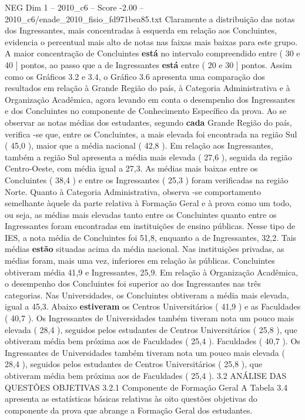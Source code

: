 \begin{textsample}{NEG Dim 1 – 2010\_c6 – Score -2.00 – 2010\_c6/enade\_2010\_fisio\_fd971bea85.txt}
Claramente a distribuição das notas dos Ingressantes, mais concentradas à esquerda em relação aos Concluintes, evidencia o percentual mais alto de notas nas faixas mais baixas para este grupo.
A maior concentração de Concluintes \textbf{está} no intervalo compreendido entre ( 30 e 40 ] pontos, ao passo que a de Ingressantes \textbf{está} entre ( 20 e 30 ] pontos.
Assim como os Gráficos 3.2 e 3.4, o Gráfico 3.6 apresenta uma comparação dos resultados em relação à Grande Região do país, à Categoria Administrativa e à Organização Acadêmica, agora levando em conta o desempenho dos Ingressantes e dos Concluintes no componente de Conhecimento Específico da prova.
Ao se observar as notas médias dos estudantes, segundo \textbf{cada} Grande Região do país, verifica -se que, entre os Concluintes, a mais elevada foi encontrada na região Sul ( 45,0 ), maior que a média nacional ( 42,8 ).
Em relação aos Ingressantes, também a região Sul apresenta a média mais elevada ( 27,6 ), seguida da região Centro-Oeste, com média igual a 27,3.
As médias mais baixas entre os Concluintes ( 38,4 ) e entre os Ingressantes ( 25,3 ) foram verificadas na região Norte.
Quanto à Categoria Administrativa, observa -se comportamento semelhante àquele da parte relativa à Formação Geral e à prova como um todo, ou seja, as médias mais elevadas tanto entre os Concluintes quanto entre os Ingressantes foram encontradas em instituições de ensino públicas.
Nesse tipo de IES, a nota média de Concluintes foi 51,8, enquanto a de Ingressantes, 32,2.
Tais médias \textbf{estão} situadas acima da média nacional.
Nas instituições privadas, as médias foram, mais uma vez, inferiores em relação às públicas.
Concluintes obtiveram média 41,9 e Ingressantes, 25,9.
Em relação à Organização Acadêmica, o desempenho dos Concluintes foi superior ao dos Ingressantes nas três categorias.
Nas Universidades, os Concluintes obtiveram a média mais elevada, igual a 45,3.
Abaixo \textbf{estiveram} os Centros Universitários ( 41,9 ) e as Faculdades ( 40,7 ).
Os Ingressantes de Universidades também tiveram nota um pouco mais elevada ( 28,4 ), seguidos pelos estudantes de Centros Universitários ( 25,8 ), que obtiveram média bem próxima aos de Faculdades ( 25,4 ).
Faculdades ( 40,7 ).
Os Ingressantes de Universidades também tiveram nota um pouco mais elevada ( 28,4 ), seguidos pelos estudantes de Centros Universitários ( 25,8 ), que obtiveram média bem próxima aos de Faculdades ( 25,4 ). 3.2 ANÁLISE DAS QUESTÕES OBJETIVAS 3.2.1 Componente de Formação Geral A Tabela 3.4 apresenta as estatísticas básicas relativas às oito questões objetivas do componente da prova que abrange a Formação Geral dos estudantes.

\end{textsample}
